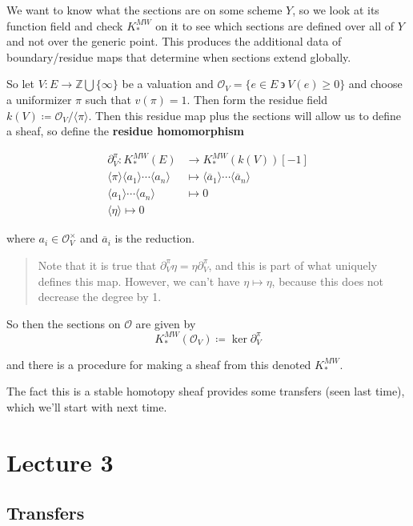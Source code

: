 \documentclass[11pt]{scrreprt}
\theoremstyle{definition}
\newcommand{\ZZ}[0]{{\mathbb{Z}}}
\newcommand{\suchthat}[0]{{~\backepsilon ~}}
\newcommand{\generators}[1]{\langle{#1}\rangle}
\newcommand{\theset}[1]{\{{#1}\}}
\newcommand{\union}[0]{\bigcup}
\newcommand{\del}[0]{{\partial}}
\newcommand{\definedas}[0]{\coloneqq}
\begin{document}
We want to know what the sections are on some scheme \(Y\), so we look
at its function field and check \(K^{MW}_*\) on it to see which sections
are defined over all of \(Y\) and not over the generic point. This
produces the additional data of boundary/residue maps that determine
when sections extend globally.

So let \(V:E \to \ZZ \union \theset\infty\) be a valuation and
\(\mathcal O_V = \theset{e\in E \suchthat V(e) \geq 0}\) and choose a
uniformizer \(\pi\) such that \(v(\pi)=1\). Then form the residue field
\(k(V) \definedas \mathcal O_V / \generators{\pi}\). Then this residue
map plus the sections will allow us to define a sheaf, so define the
\textbf{residue homomorphism}

\begin{align*}
\del_V^\pi: K_*^{MW}(E) &\to K_*^{MW}(k(V))[-1] \\
\generators{\pi}\generators{a_1}\cdots\generators{a_n} &\mapsto \generators{\overline a_1} \cdots\generators{\overline a_n} \\
\generators{a_1} \cdots \generators{a_n} &\mapsto 0 \\
\generators{\eta} \mapsto 0
\end{align*}

where \(a_i \in \mathcal{O}_V^\times\) and \(\overline a_i\) is the
reduction.

\begin{quote}
Note that it is true that \(\del_V^\pi \eta = \eta \del_V^\pi\), and
this is part of what uniquely defines this map. However, we can't have
\(\eta \mapsto \eta\), because this does not decrease the degree by 1.
\end{quote}

So then the sections on \(\mathcal O\) are given by \[
K^{MW}_*(\mathcal O_V) \definedas \ker \del_V^\pi
\]

and there is a procedure for making a sheaf from this denoted
\(K_*^{MW}\).

The fact this is a stable homotopy sheaf provides some transfers (seen
last time), which we'll start with next time.

\hypertarget{lecture-3}{%
\chapter{Lecture 3}\label{lecture-3}}

\hypertarget{transfers}{%
\section{Transfers}\label{transfers}}
\end{document}
